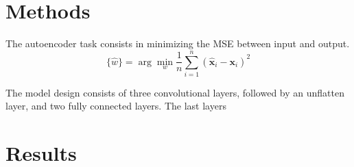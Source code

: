 \documentclass[11pt]{article} %
\begin{document}
\section{Methods}
The autoencoder task consists in minimizing the MSE between input and output.
\begin{equation}
\{\hat{w}\}= \arg\min_{w} \frac{1}{n}\sum_{i = 1}^{n}\left(\hat{\mathbf{x}}_i - \mathbf{x}_i\right)^{2}
\end{equation}

The model design consists of three convolutional layers, followed by an unflatten layer, and two fully connected layers. The last layers
\section{Results}
\end{document}
